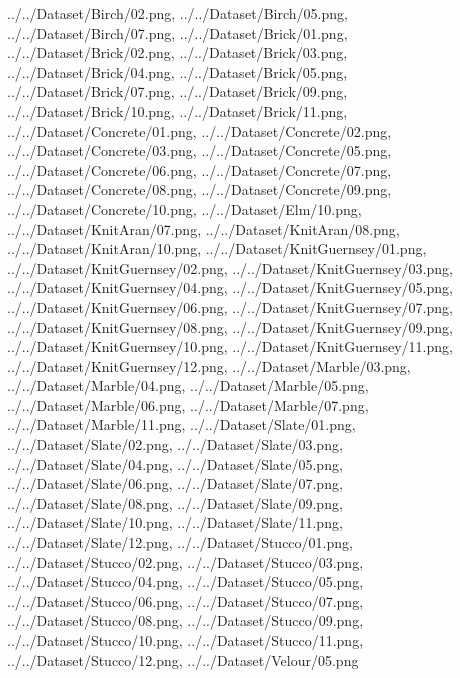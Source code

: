 \documentclass[12pt,a4paper]{article}
\begin{document}
\begin{singlespace}
{../../Dataset/Birch/02.png,
../../Dataset/Birch/05.png,
../../Dataset/Birch/07.png,
../../Dataset/Brick/01.png,
../../Dataset/Brick/02.png,
../../Dataset/Brick/03.png,
../../Dataset/Brick/04.png,
../../Dataset/Brick/05.png,
../../Dataset/Brick/07.png,
../../Dataset/Brick/09.png,
../../Dataset/Brick/10.png,
../../Dataset/Brick/11.png,
../../Dataset/Concrete/01.png,
../../Dataset/Concrete/02.png,
../../Dataset/Concrete/03.png,
../../Dataset/Concrete/05.png,
../../Dataset/Concrete/06.png,
../../Dataset/Concrete/07.png,
../../Dataset/Concrete/08.png,
../../Dataset/Concrete/09.png,
../../Dataset/Concrete/10.png,
../../Dataset/Elm/10.png,
../../Dataset/KnitAran/07.png,
../../Dataset/KnitAran/08.png,
../../Dataset/KnitAran/10.png,
../../Dataset/KnitGuernsey/01.png,
../../Dataset/KnitGuernsey/02.png,
../../Dataset/KnitGuernsey/03.png,
../../Dataset/KnitGuernsey/04.png,
../../Dataset/KnitGuernsey/05.png,
../../Dataset/KnitGuernsey/06.png,
../../Dataset/KnitGuernsey/07.png,
../../Dataset/KnitGuernsey/08.png,
../../Dataset/KnitGuernsey/09.png,
../../Dataset/KnitGuernsey/10.png,
../../Dataset/KnitGuernsey/11.png,
../../Dataset/KnitGuernsey/12.png,
../../Dataset/Marble/03.png,
../../Dataset/Marble/04.png,
../../Dataset/Marble/05.png,
../../Dataset/Marble/06.png,
../../Dataset/Marble/07.png,
../../Dataset/Marble/11.png,
../../Dataset/Slate/01.png,
../../Dataset/Slate/02.png,
../../Dataset/Slate/03.png,
../../Dataset/Slate/04.png,
../../Dataset/Slate/05.png,
../../Dataset/Slate/06.png,
../../Dataset/Slate/07.png,
../../Dataset/Slate/08.png,
../../Dataset/Slate/09.png,
../../Dataset/Slate/10.png,
../../Dataset/Slate/11.png,
../../Dataset/Slate/12.png,
../../Dataset/Stucco/01.png,
../../Dataset/Stucco/02.png,
../../Dataset/Stucco/03.png,
../../Dataset/Stucco/04.png,
../../Dataset/Stucco/05.png,
../../Dataset/Stucco/06.png,
../../Dataset/Stucco/07.png,
../../Dataset/Stucco/08.png,
../../Dataset/Stucco/09.png,
../../Dataset/Stucco/10.png,
../../Dataset/Stucco/11.png,
../../Dataset/Stucco/12.png,
../../Dataset/Velour/05.png}


\end{singlespace}
\end{document}
